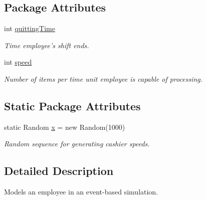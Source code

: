 \subsection*{Package Attributes}
\begin{CompactItemize}
\item 
\hypertarget{class_cashier_c190b84e4cb0074a9e1b6c2fa3d1cda9}{
int \hyperlink{class_cashier_c190b84e4cb0074a9e1b6c2fa3d1cda9}{quittingTime}}
\label{class_cashier_c190b84e4cb0074a9e1b6c2fa3d1cda9}

\begin{CompactList}\small\item\em Time employee's shift ends. \item\end{CompactList}\item 
\hypertarget{class_cashier_fdf1c44c8ba11bad963c5a2deb96ab24}{
int \hyperlink{class_cashier_fdf1c44c8ba11bad963c5a2deb96ab24}{speed}}
\label{class_cashier_fdf1c44c8ba11bad963c5a2deb96ab24}

\begin{CompactList}\small\item\em Number of items per time unit employee is capable of processing. \item\end{CompactList}\end{CompactItemize}
\subsection*{Static Package Attributes}
\begin{CompactItemize}
\item 
\hypertarget{class_cashier_013728f8b9e753298d85008bdc0d6e3f}{
static Random \hyperlink{class_cashier_013728f8b9e753298d85008bdc0d6e3f}{x} = new Random(1000)}
\label{class_cashier_013728f8b9e753298d85008bdc0d6e3f}

\begin{CompactList}\small\item\em Random sequence for generating cashier speeds. \item\end{CompactList}\end{CompactItemize}


\subsection{Detailed Description}
Models an employee in an event-based simulation. 


